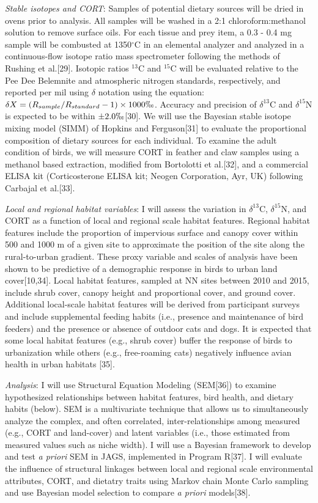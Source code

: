 \documentclass[12pt]{article}
\begin{document}
\noindent \textit{Stable isotopes and CORT}: Samples of potential dietary sources will be dried in ovens prior to analysis. All samples will be washed in a 2:1 chloroform:methanol solution to remove surface oils. For each tissue and prey item, a 0.3 - 0.4 mg sample will be combusted at 1350$^{\circ}$C in an elemental analyzer and analyzed in a continuous-flow isotope ratio mass spectrometer following the methods of Rushing et al.[29]. Isotopic ratios $^{13}$C and $^{15}$C will be evaluated relative to the Pee Dee Belemnite and atmospheric nitrogen standards, respectively, and reported per mil using $\delta$ notation using the equation: $\delta{X} = (R_{sample}/R_{standard} -1) \times 1000\permil$. Accuracy and precision of $\delta^{13}$C and $\delta^{15}$N is expected to be within $\pm 2.0 \permil$[30]. We will use the Bayesian stable isotope mixing model (SIMM) of Hopkins and Ferguson[31] to evaluate the proportional composition of dietary sources for each individual. To examine the adult condition of birds, we will measure CORT in feather and claw samples using a methanol based extraction, modified from Bortolotti et al.[32], and a commercial ELISA kit (Corticosterone ELISA kit; Neogen Corporation, Ayr, UK) following Carbajal et al.[33]. \par 

\noindent \textit{Local and regional habitat variables}: I will assess the variation in $\delta^{13}$C,  $\delta^{15}$N, and CORT as a function of local and regional scale habitat features. Regional habitat features include the proportion of impervious surface and canopy cover within 500 and 1000 m of a given site to approximate the position of the site along the rural-to-urban gradient. These proxy variable and scales of analysis have been shown to be predictive of a demographic response in birds to urban land cover[10,34]. Local habitat features, sampled at NN sites between 2010 and 2015, include shrub cover, canopy height and proportional cover, and ground cover. Additional local-scale habitat features will be derived from participant surveys and include supplemental feeding habits (i.e., presence and maintenance of bird feeders) and the presence or absence of outdoor cats and dogs. It is expected that some local habitat features (e.g., shrub cover) buffer the response of birds to urbanization while others (e.g., free-roaming cats) negatively influence avian health in urban habitats [35].\par

\noindent \textit{Analysis}: I will use Structural Equation Modeling (SEM[36]) to examine hypothesized relationships between habitat features, bird health, and dietary habits (below). SEM is a multivariate technique that allows us to simultaneously analyze the complex, and often correlated, inter-relationships among measured (e.g., CORT and land-cover) and latent variables (i.e., those estimated from measured values such as niche width). I will use a Bayesian framework to develop and test \textit{a priori} SEM in JAGS, implemented in Program R[37]. I will evaluate the influence of structural linkages between local and regional scale environmental attributes, CORT, and dietatry traits using Markov chain Monte Carlo sampling and use Bayesian model selection to compare \textit{a priori} models[38]. 
\end{document}
